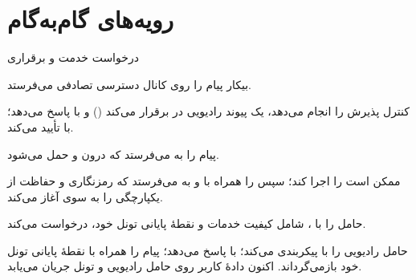 \documentclass[11pt,a4paper]{article}
\begin{document}
\begin{acnfigure}
  \caption{معماری  با  و حوزه‌های هستهٔ سوئیچ مداری و سوئیچ بسته‌ای.
  خط‌چین: سیگنالینگ  به .}
  \label{fig:umts}
\end{acnfigure}

\begin{acnfigure}
  \caption{درخت کد . تخصیص $(1,1,1,1)$ والد $(1,1)$ و ریشه را مسدود می‌کند، اما هم‌شاخهٔ
  آن $(1,1,-1,-1)$ قابل استفاده می‌ماند؛ همهٔ کدهای یک  بر هم متعامدند.}
  \label{fig:ovsf}
\end{acnfigure}

\section{رویه‌های گام‌به‌گام}
\begin{procedurebox}{درخواست خدمت  و برقراری }\label{proc:rab}
\begin{steps}
  \item {} بیکار پیام  را روی کانال دسترسی تصادفی می‌فرستد.
  \item {} کنترل پذیرش را انجام می‌دهد، یک پیوند رادیویی در  برقرار می‌کند
        () و با  پاسخ می‌دهد؛  با
         تأیید می‌کند.
  \item {} پیام   را به  می‌فرستد که درون
          و   حمل می‌شود.
  \item {} ممکن است  را اجرا کند؛ سپس   را
        همراه با  و  به  می‌فرستد که رمزنگاری و حفاظت از یکپارچگی را به سوی
         آغاز می‌کند.
  \item {} حامل را با  ، شامل کیفیت خدمات و نقطهٔ
        پایانی تونل  خود، درخواست می‌کند.
  \item {} حامل رادیویی را با  پیکربندی می‌کند؛  با
         پاسخ می‌دهد؛  پیام  را
        همراه با نقطهٔ پایانی تونل خود بازمی‌گرداند. اکنون دادهٔ کاربر روی حامل رادیویی و تونل
         جریان می‌یابد.
\end{steps}
\end{procedurebox}
\end{document}

